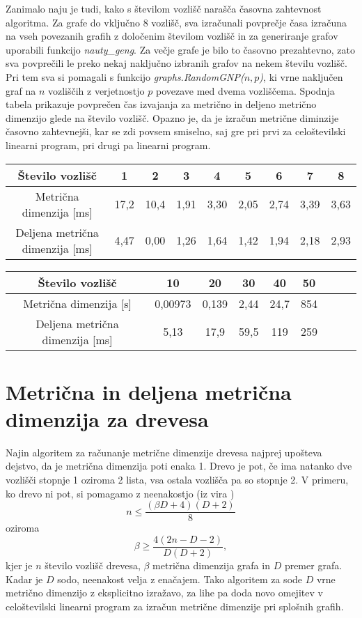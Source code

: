 \documentclass[a4paper]{report}
\begin{document}
Zanimalo naju je tudi, kako s številom vozlišč narašča časovna zahtevnost algoritma. Za grafe do vključno 8 vozlišč, sva izračunali povprečje časa izračuna na vseh povezanih grafih z določenim številom vozlišč in za generiranje grafov uporabili funkcijo \textit{nauty\_geng}. Za večje grafe je bilo to časovno prezahtevno, zato sva povprečili le preko nekaj naključno izbranih grafov na nekem številu vozlišč. Pri tem sva si pomagali s funkcijo \textit{graphs.RandomGNP($n, p$)}, ki vrne naključen graf na $n$ vozliščih z verjetnostjo $p$ povezave med dvema vozliščema. Spodnja tabela prikazuje povprečen čas izvajanja za metrično in deljeno metrično dimenzijo glede na število vozlišč. Opazno je, da je izračun metrične diminzije časovno zahtevnejši, kar se zdi povsem smiselno, saj gre pri prvi za celoštevilski linearni program, pri drugi pa linearni program.

\begin{center}
\resizebox{13cm}{!} {
\begin{tabular}{||c| |*{8}{c|}|}
\hline\hline
Število vozlišč & 1 & 2 & 3 & 4 & 5 & 6 & 7 & 8 \\
\hline
Metrična dimenzija [ms] & 17,2 & 10,4 & 1,91 & 3,30 & 2,05 & 2,74 & 3,39 & 3,63 \\
\hline
Deljena metrična dimenzija [ms] & 4,47 & 0,00 & 1,26 & 1,64 & 1,42 & 1,94 & 2,18 & 2,93 \\
\hline\hline
\end{tabular}}
\end{center}

\begin{center}
\resizebox{13cm}{!} {
\begin{tabular}{||c| |*{8}{c|}|}
\hline\hline
Število vozlišč & 10 & 20 & 30 & 40 & 50 \\
\hline
Metrična dimenzija [s] & 0,00973 & 0,139 & 2,44 & 24,7 & 854\\
\hline
Deljena metrična dimenzija [ms] & 5,13 & 17,9 & 59,5 & 119 & 259 \\
\hline\hline
\end{tabular}}
\end{center}

\section*{Metrična in deljena metrična dimenzija za drevesa}

Najin algoritem za računanje metrične dimenzije drevesa najprej upošteva dejstvo, da je metrična dimenzija poti enaka 1. Drevo je pot, če ima natanko dve vozlišči stopnje 1 oziroma 2 lista, vsa ostala vozlišča pa so stopnje 2. V primeru, ko drevo ni pot, si pomagamo z neenakostjo (iz vira \cite{1}) $$n \le \frac{( \beta D + 4)(D + 2)}{8}$$ oziroma $$\beta \ge \frac{4(2n - D - 2)}{D(D + 2)},$$ kjer je $n$ število vozlišč drevesa, $\beta$ metrična dimenzija grafa in $D$ premer grafa. Kadar je $D$ sodo, neenakost velja z enačajem. Tako algoritem za sode $D$ vrne metrično dimenzijo z eksplicitno izražavo, za lihe pa doda novo omejitev v celoštevilski linearni program za izračun metrične dimenzije pri splošnih grafih.\\
\end{document}
